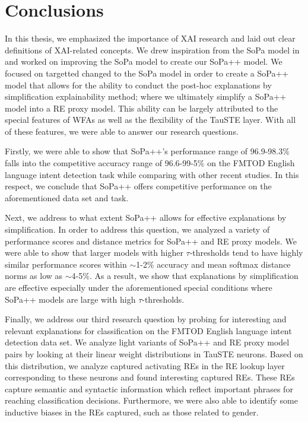 \chapter{Conclusions}

\label{chapter:conclusions}

In this thesis, we emphasized the importance of XAI research and laid out clear
definitions of XAI-related concepts. We drew inspiration from the SoPa model in
\citet{schwartz2018sopa} and worked on improving the SoPa model to create our
SoPa++ model. We focused on targetted changed to the SoPa model in order to
create a SoPa++ model that allows for the ability to conduct the post-hoc
explanations by simplification explainability method; where we ultimately
simplify a SoPa++ model into a RE proxy model. This ability can be largely
attributed to the special features of WFAs as well as the flexibility of the
TauSTE layer. With all of these features, we were able to answer our research
questions.

Firstly, we were able to show that SoPa++'s performance range of 96.9-98.3$\%$
falls into the competitive accuracy range of 96.6-99-5$\%$ on the FMTOD English
language intent detection task while comparing with other recent studies. In
this respect, we conclude that SoPa++ offers competitive performance on the
aforementioned data set and task.

Next, we address to what extent SoPa++ allows for effective explanations by
simplification. In order to address this question, we analyzed a variety of
performance scores and distance metrics for SoPa++ and RE proxy models. We were
able to show that larger models with higher $\tau$-thresholds tend to have
highly similar performance scores within $\sim$1-2$\%$ accuracy and mean softmax
distance norms as low as $\sim$4-5$\%$. As a result, we show that explanations
by simplification are effective especially under the aforementioned special
conditions where SoPa++ models are large with high $\tau$-thresholds.

Finally, we address our third research question by probing for interesting and
relevant explanations for classification on the FMTOD English language intent
detection data set. We analyze light variants of SoPa++ and RE proxy model pairs
by looking at their linear weight distributions in TauSTE neurons. Based on this
distribution, we analyze captured activating REs in the RE lookup layer
corresponding to these neurons and found interesting captured REs. These REs
capture semantic and syntactic information which reflect important phrases for
reaching classification decisions. Furthermore, we were also able to identify
some inductive biases in the REs captured, such as those related to gender.

